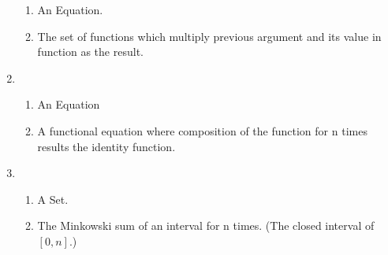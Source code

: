 \documentclass{article}
\begin{document}
\begin{enumerate}
\begin{enumerate}[label=\roman*]
	\item An Equation.
	\item The set of functions which multiply previous argument and its value in function as the result.
\end{enumerate}
	\item 
\begin{enumerate}[label=\roman*]
	\item An Equation
	\item A functional equation where composition of the function for n times results the identity function.
\end{enumerate}
	\item 
\begin{enumerate}[label=\roman*]
	\item A Set.
	\item The Minkowski sum of an interval for n times. (The closed interval of $[0,n]$.)
\end{enumerate}
\end{enumerate}
\end{document}
